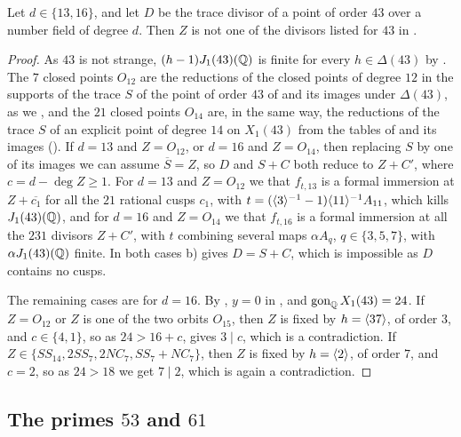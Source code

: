 \begin{proposition}\label{prop:43}
Let $d\in\{13,16\}$, and let $D$ be the trace divisor of a point of order $43$ over a number field of degree $d$. Then $Z$ is not one of the divisors listed for $43$ in .
\end{proposition}

\begin{proof}
As $43$ is not strange, $(h-1)J_1(43)(\mathbb{Q})$ is finite for every $h\in\Delta(43)$ by . The $7$ closed points $O_{12}$ are the reductions of the closed points of degree $12$ in the supports of the trace $S$ of the point of order $43$ of  and its images under $\Delta(43)$, as we , and the $21$ closed points $O_{14}$ are, in the same way, the reductions of the trace $S$ of an explicit point of degree $14$ on $X_1(43)$ from the tables of \cite{vanHoeij} and its images (). If $d=13$ and $Z=O_{12}$, or $d=16$ and $Z=O_{14}$, then replacing $S$ by one of its images we can assume $\overline S=Z$, so $D$ and $S+C$ both reduce to $Z+C'$, where $c=d-\deg Z\geq1$. For $d=13$ and $Z=O_{12}$ we  that $f_{t,13}$ is a formal immersion at $Z+\overline{c_1}$ for all the $21$ rational cusps $c_1$, with $t=(\langle 3\rangle^{-1}-1)\langle 11\rangle^{-1}A_{11}$, which kills $J_1(43)(\mathbb{Q})$, and for $d=16$ and $Z=O_{14}$ we  that $f_{t,16}$ is a formal immersion at all the $231$ divisors $Z+C'$, with $t$ combining several maps $\alpha A_q$, $q\in\{3,5,7\}$, with $\alpha J_1(43)(\mathbb{Q})$ finite. In both cases  b) gives $D=S+C$, which is impossible as $D$ contains no cusps.

The remaining cases are for $d=16$. By , $y=0$ in , and $\operatorname{gon}_{\mathbb{Q}} X_1(43)=24$. If $Z=O_{12}$ or $Z$ is one of the two orbits $O_{15}$, then $Z$ is fixed by $h=\langle 37\rangle$, of order $3$, and $c\in\{4,1\}$, so as $24>16+c$,  gives $3\mid c$, which is a contradiction. If $Z\in\{SS_{14},2SS_7,2NC_7,SS_7+NC_7\}$, then $Z$ is fixed by $h=\langle 2\rangle$, of order $7$, and $c=2$, so as $24>18$ we get $7\mid2$, which is again a contradiction.
\end{proof}

\subsection{The primes \texorpdfstring{$53$}{53} and \texorpdfstring{$61$}{61}}

